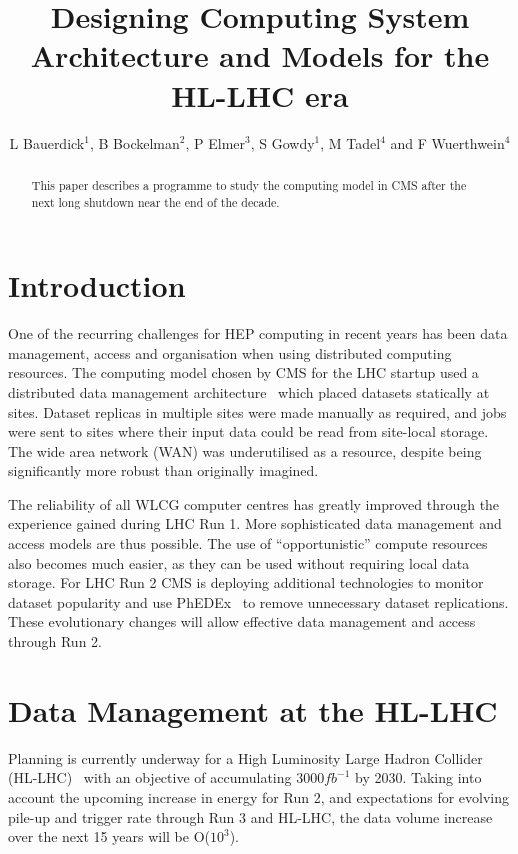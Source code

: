 \documentclass[a4paper]{jpconf}
\begin{document}
\title{Designing Computing System Architecture and Models for the HL-LHC era}

\author{L Bauerdick$^1$, B Bockelman$^2$, P Elmer$^3$, S Gowdy$^1$, M
  Tadel$^4$ and F Wuerthwein$^4$}

\address{$^1$Fermilab, Batavia, IL 60510, USA\\
  $^2$Computer Science \& Engineering, University of Nebraska-Lincoln,
  Lincoln, NE 68588, USA\\
  $^3$Department of Physics, Princeton University, Princeton, NJ 08540, USA\\
  $^4$Department of Physics, UCSD, La Jolla, CA  92093, USA}


\begin{abstract}
This paper describes a programme to study the computing model in CMS after 
the next long shutdown near the end of the decade.
\end{abstract}

\section{Introduction}

One of the recurring challenges for HEP computing in recent years has
been data management, access and organisation when using distributed
computing resources.  The computing model chosen by CMS for the LHC
startup used a distributed data management architecture~\cite{CMSCTDR}
which placed datasets statically at sites. Dataset replicas in
multiple sites were made manually as required, and jobs were sent to
sites where their input data could be read from site-local storage.
The wide area network (WAN) was underutilised as a resource, despite
being significantly more robust than originally imagined.

The reliability of all WLCG computer centres has greatly improved
through the experience gained during LHC Run 1. More sophisticated
data management and access models are thus possible. The use of
``opportunistic'' compute resources also becomes much easier, as they
can be used without requiring local data storage.  For LHC Run 2 CMS
is deploying additional technologies to monitor dataset popularity and
use PhEDEx~\cite{PHEDEX} to remove unnecessary dataset
replications. These evolutionary changes will allow effective data
management and access through Run 2.

\section{Data Management at the HL-LHC}
Planning is currently underway for a High Luminosity Large Hadron
Collider (HL-LHC)~\cite{HLLHC} with an objective of accumulating
${3000fb^{-1}}$ by 2030. Taking into account the upcoming increase
in energy for Run 2, and expectations for evolving pile-up and
trigger rate through Run 3 and HL-LHC, the data volume increase
over the next 15 years will be O($10^3$).
\end{document}

